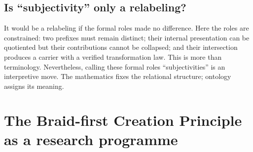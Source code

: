 \documentclass[11pt]{article}
\theoremstyle{definition}
\theoremstyle{remark}
\begin{document}
\subsection{Is ``subjectivity'' only a relabeling?}

It would be a relabeling if the formal roles made no difference. Here the roles are constrained: two prefixes must remain distinct; their internal presentation can be quotiented but their contributions cannot be collapsed; and their intersection produces a carrier with a verified transformation law. This is more than terminology. Nevertheless, calling these formal roles ``subjectivities'' is an interpretive move. The mathematics fixes the relational structure; ontology assigns its meaning.

\section{The Braid-first Creation Principle as a research programme}
\end{document}
